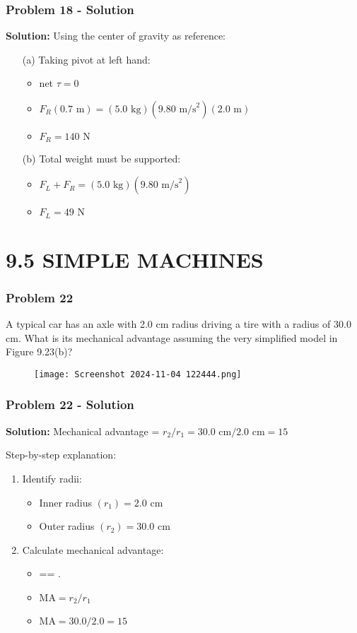 \documentclass{beamer}
\begin{document}
\begin{frame}
\frametitle{Problem 18 - Solution}
\textbf{Solution:}
Using the center of gravity as reference:
\begin{itemize}
    \item[(a)] Taking pivot at left hand:
    \begin{itemize}
        \item net $\tau = 0$
        \item $F_R(0.7 \text{ m}) = (5.0 \text{ kg})(9.80 \text{ m/s}^2)(2.0 \text{ m})$
        \item $F_R = 140 \text{ N}$
    \end{itemize}
    \item[(b)] Total weight must be supported:
    \begin{itemize}
        \item $F_L + F_R = (5.0 \text{ kg})(9.80 \text{ m/s}^2)$
        \item $F_L = 49 \text{ N}$
    \end{itemize}
\end{itemize}
\end{frame}

\section{9.5 SIMPLE MACHINES}

\begin{frame}
\frametitle{Problem 22}
A typical car has an axle with 2.0 cm radius driving a tire with a radius of 30.0 cm. What is its mechanical advantage assuming the very simplified model in Figure 9.23(b)?
\begin{figure}[H]
    \centering
    \texttt{[image: Screenshot 2024-11-04 122444.png]}
\end{figure}

\end{frame}

\begin{frame}
\frametitle{Problem 22 - Solution}
\textbf{Solution:}
Mechanical advantage = $r_2/r_1 = 30.0 \text{ cm}/2.0 \text{ cm} = 15$

Step-by-step explanation:
\begin{enumerate}
    \item Identify radii:
    \begin{itemize}
        \item Inner radius $(r_1) = 2.0 \text{ cm}$
        \item Outer radius $(r_2) = 30.0 \text{ cm}$
    \end{itemize}
    \item Calculate mechanical advantage:
    \begin{itemize}
      \item {}== .
        \item $\text{MA} = r_2/r_1$
        \item $\text{MA} = 30.0/2.0 = 15$
    \end{itemize}
\end{enumerate}
\end{frame}
\end{document}
